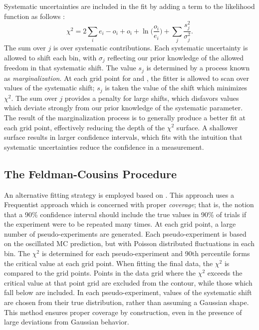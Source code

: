 Systematic uncertainties are included in the fit by adding a term to the
likelihood function as follows \cite{pdg}:
\begin{equation}
\chi^2 = 2 \sum_i e_i - o_i + o_i + \ln \bigg (\frac{o_i}{e_i} \bigg)
+ \sum_j \frac{s_j^2}{\sigma_j^2}.
\end{equation}
The sum over $j$ is over systematic contributions.  Each systematic uncertainty
is allowed to shift each bin, with $\sigma_j$ reflecting our prior
knowledge of the allowed freedom in that systematic shift.
The value $s_j$ is determined by a process known as \textit{marginalization}.
At each grid point for \deltamtht and \thetatth, the fitter is allowed to scan
over values of the systematic shift; $s_j$ is taken the value of the shift
which minimizes $\chi^2$.
The sum over $j$ provides a penalty for large shifts, which disfavors values
which deviate strongly from our prior knowledge of the systematic parameter.
The result of the marginalization process is to generally produce a better fit
at each grid point, effectively reducing the depth of the $\chi^2$ surface.
A shallower surface results in larger confidence intervals, which fits with
the intuition that systematic uncertainties
reduce the confidence in a measurement.

\subsection{The Feldman-Cousins Procedure}
\label{feldman_cousins_section}

An alternative fitting strategy is employed based on \cite{feldman1998unified}.
This approach uses a Frequentist approach which is concerned with proper
\textit{coverage}; that is, the notion that a 90\% confidence interval
should include the true values in 90\% of trials if the experiment
were to be repeated many times.
At each grid point, a large number of pseudo-experiments are generated.
Each pseudo-experiment is based on the oscillated MC prediction, but with
Poisson distributed fluctuations in each bin.
The $\chi^2$ is determined for each pseudo-experiment
and 90th percentile forms the critical value at each grid point.
When fitting the final data, the $\chi^2$ is compared to the grid points.
Points in the data grid where the $\chi^2$ exceeds the critical value at that
point grid are excluded from the contour, while those which fall below are
included.
In each pseudo-experiment, values of the systematic shift are chosen from their
true distribution, rather than assuming a Gaussian shape.
This method ensures proper coverage by construction, even in the presence
of large deviations from Gaussian behavior.





